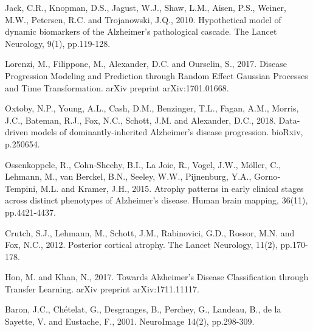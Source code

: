 \documentclass{llncs}
\begin{document}

\begin{thebibliography}{5}

Jack, C.R., Knopman, D.S., Jagust, W.J., Shaw, L.M., Aisen, P.S., Weiner, M.W., Petersen, R.C. and Trojanowski, J.Q., 2010. Hypothetical model of dynamic biomarkers of the Alzheimer's pathological cascade. The Lancet Neurology, 9(1), pp.119-128.

Lorenzi, M., Filippone, M., Alexander, D.C. and Ourselin, S., 2017. Disease Progression Modeling and Prediction through Random Effect Gaussian Processes and Time Transformation. arXiv preprint arXiv:1701.01668.


Oxtoby, N.P., Young, A.L., Cash, D.M., Benzinger, T.L., Fagan, A.M., Morris, J.C., Bateman, R.J., Fox, N.C., Schott, J.M. and Alexander, D.C., 2018. Data-driven models of dominantly-inherited Alzheimer's disease progression. bioRxiv, p.250654.

Ossenkoppele, R., Cohn‐Sheehy, B.I., La Joie, R., Vogel, J.W., Möller, C., Lehmann, M., van Berckel, B.N., Seeley, W.W., Pijnenburg, Y.A., Gorno‐Tempini, M.L. and Kramer, J.H., 2015. Atrophy patterns in early clinical stages across distinct phenotypes of Alzheimer's disease. Human brain mapping, 36(11), pp.4421-4437.

Crutch, S.J., Lehmann, M., Schott, J.M., Rabinovici, G.D., Rossor, M.N. and Fox, N.C., 2012. Posterior cortical atrophy. The Lancet Neurology, 11(2), pp.170-178.

Hon, M. and Khan, N., 2017. Towards Alzheimer's Disease Classification through Transfer Learning. arXiv preprint arXiv:1711.11117.

Baron, J.C., Ch\'{e}telat, G., Desgranges, B., Perchey, G., Landeau, B., {de la Sayette}, V. and Eustache, F., 2001. NeuroImage 14(2), pp.298-309.

\end{thebibliography}

\clearpage
\end{document}
